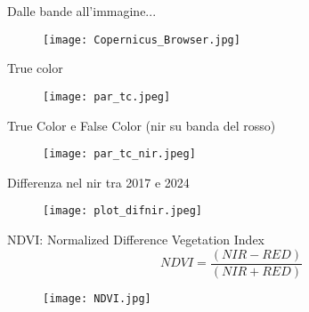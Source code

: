 \documentclass{beamer} %
\begin{document}
\begin{frame}{Dalle bande all'immagine...}
 \begin{multicols}{2}
    
    \columnbreak
    \begin{figure}
        \raggedleft %
        \texttt{[image: Copernicus\_Browser.jpg]}
    \end{figure}
    \end{multicols}
\end{frame}

\begin{frame}{True color}

\begin{figure}
    \centering
    \texttt{[image: par\_tc.jpeg]}
\end{figure}
        \end{frame}

\begin{frame}{True Color e False Color (nir su banda del rosso)}
\begin{figure}
    \centering
    \texttt{[image: par\_tc\_nir.jpeg]}
\end{figure}
        \end{frame}

\begin{frame}{Differenza nel nir tra 2017 e 2024}

    \begin{figure}
        \centering
        \texttt{[image: plot\_difnir.jpeg]}
    \end{figure}
\end{frame}

 \begin{frame}{NDVI: Normalized Difference Vegetation Index}
            \begin{equation}
                NDVI = \frac{(NIR - RED)}{(NIR + RED)}
            \end{equation}
            \begin{figure}
                \centering
                \texttt{[image: NDVI.jpg]}
            \end{figure}
        \end{frame}
\end{document}
